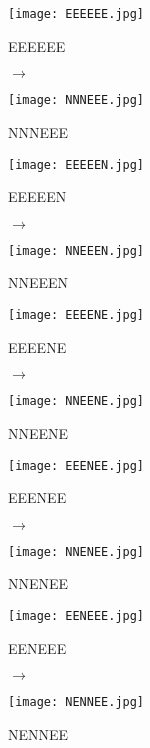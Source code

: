 \begin{figure}[!htb]
\centering
\begin{minipage}[t]{0.3\textwidth}
\centering
\texttt{[image: EEEEEE.jpg]}
\caption*{EEEEEE}
\end{minipage}
$\to$
\begin{minipage}[t]{0.3\textwidth}
\centering
\texttt{[image: NNNEEE.jpg]}
\caption*{NNNEEE}
\end{minipage}
\end{figure}

\begin{figure}[!htb]
\centering
\begin{minipage}[t]{0.3\textwidth}
\centering
\texttt{[image: EEEEEN.jpg]}
\caption*{EEEEEN}
\end{minipage}
$\to$
\begin{minipage}[t]{0.3\textwidth}
\centering
\texttt{[image: NNEEEN.jpg]}
\caption*{NNEEEN}
\end{minipage}
\end{figure}

\begin{figure}[!htb]
\centering
\begin{minipage}[t]{0.3\textwidth}
\centering
\texttt{[image: EEEENE.jpg]}
\caption*{EEEENE}
\end{minipage}
$\to$
\begin{minipage}[t]{0.3\textwidth}
\centering
\texttt{[image: NNEENE.jpg]}
\caption*{NNEENE}
\end{minipage}
\end{figure}

\begin{figure}[!htb]
\centering
\begin{minipage}[t]{0.3\textwidth}
\centering
\texttt{[image: EEENEE.jpg]}
\caption*{EEENEE}
\end{minipage}
$\to$
\begin{minipage}[t]{0.3\textwidth}
\centering
\texttt{[image: NNENEE.jpg]}
\caption*{NNENEE}
\end{minipage}
\end{figure}

\begin{figure}[!htb]
\centering
\begin{minipage}[t]{0.3\textwidth}
\centering
\texttt{[image: EENEEE.jpg]}
\caption*{EENEEE}
\end{minipage}
$\to$
\begin{minipage}[t]{0.3\textwidth}
\centering
\texttt{[image: NENNEE.jpg]}
\caption*{NENNEE}
\end{minipage}
\end{figure}

